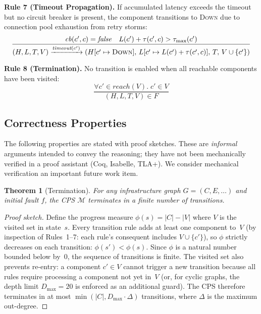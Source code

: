 \documentclass[10pt,twocolumn]{article}
\newtheorem{theorem}{Theorem}
\begin{document}
\medskip\noindent
\textbf{Rule 7 (Timeout Propagation).}
If accumulated latency exceeds the timeout but no circuit breaker is
present, the component transitions to \textsc{Down} due to connection
pool exhaustion from retry storms:
\begin{equation}
  \frac{\mathit{cb}(c', c) = \mathit{false} \quad
        L(c') + \tau(c', c) > \tau_{\max}(c')}
  {(H, L, T, V) \xrightarrow{\textit{timeout}(c')}
   (H[c' \mapsto \textsc{Down}],\, L[c' \mapsto L(c') + \tau(c',c)],\, T,\, V \cup \{c'\})}
\end{equation}

\medskip\noindent
\textbf{Rule 8 (Termination).}
No transition is enabled when all reachable components have been visited:
\begin{equation}
  \frac{\forall c' \in \mathit{reach}(V).\; c' \in V}
  {(H, L, T, V) \in F}
\end{equation}

\subsection{Correctness Properties}

The following properties are stated with proof sketches.
These are \emph{informal} arguments intended to convey the
reasoning; they have not been mechanically verified in a
proof assistant (Coq, Isabelle, TLA+). We consider mechanical
verification an important future work item.

\begin{theorem}[Termination]\label{thm:termination}
For any infrastructure graph $G = (C, E, \ldots)$ and initial fault $f$,
the CPS $\mathcal{M}$ terminates in a finite number of transitions.
\end{theorem}
\begin{proof}[Proof sketch]
Define the progress measure $\phi(s) = |C| - |V|$ where $V$ is the
visited set in state~$s$. Every transition rule adds at least one
component to~$V$ (by inspection of Rules~1--7: each rule's consequent
includes $V \cup \{c'\}$), so $\phi$ strictly decreases on each
transition: $\phi(s') < \phi(s)$. Since $\phi$ is a natural number
bounded below by~0, the sequence of transitions is finite. The visited
set also prevents re-entry: a component $c' \in V$ cannot trigger a
new transition because all rules require processing a component not
yet in~$V$ (or, for cyclic graphs, the depth limit $D_{\max} = 20$
is enforced as an additional guard). The CPS therefore terminates in
at most $\min(|C|, D_{\max} \cdot \Delta)$ transitions, where
$\Delta$ is the maximum out-degree.
\end{proof}
\end{document}
